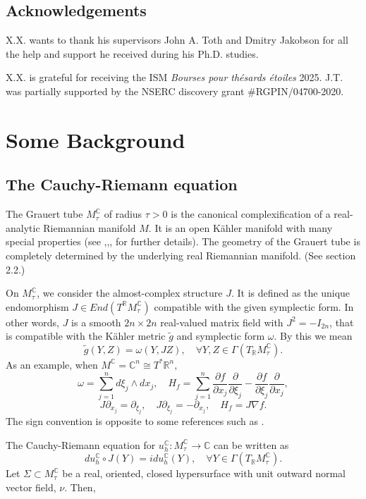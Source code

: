 \documentclass[11pt,reqno]{amsart}
\newcommand{\R}{{\mathbb R}}
\newcommand{\C}{{\mathbb C}}
\theoremstyle{definition}
\begin{document}
\subsection*{Acknowledgements}
X.X. wants to thank his supervisors John A. Toth and Dmitry Jakobson for all the help and support he received during his Ph.D. studies.

X.X. is grateful for receiving the ISM {\it Bourses pour thésards étoiles} 2025. J.T. was partially supported by the NSERC discovery grant \#RGPIN/04700-2020.




\section{Some Background} \label{tube}

\subsection{The Cauchy-Riemann equation}

The Grauert tube $M^{\mathbb{C}}_{\tau}$ of radius $\tau>0$ is the canonical complexification of a real-analytic Riemannian manifold $M$. It is an open K\"ahler manifold with many special properties (see \cite{LS91},\cite{S91},\cite{GS91},\cite{GS92} for further details). The geometry of the Grauert tube is completely determined by the underlying real Riemannian manifold. (See section 2.2.)

 On $M^{\mathbb{C}}_{\tau}$, we consider the almost-complex structure $J$. It is defined as the unique endomorphism $J\in End(T^{\R}M^{\mathbb{C}}_{\tau})$ compatible with the given symplectic form. In other words, $J$ is a smooth $2n\times 2n$ real-valued matrix field with $J^2=-I_{2n}$, that is compatible with the K\"ahler metric $\tilde{g}$ and symplectic form $\omega$. By this we mean
$$
\tilde{g}(Y,Z)=\omega(Y,JZ),\quad\forall Y,Z\in \Gamma (T_{\R}M^{\mathbb{C}}_{\tau}).
$$
As an  example, when $ M^{\C} = \mathbb{C}^n \cong T^* \R^n,$
$$
\omega=\sum_{j=1}^nd\xi_j\wedge dx_j,\quad H_f=\sum_{j=1}^n\frac{\partial f}{\partial x_j} \frac{\partial}{\partial \xi_j}-\frac{\partial f}{\partial \xi_j}\frac{\partial}{\partial x_j},
$$ 
$$
J\partial_{x_j}=\partial_{\xi_j}, \quad J\partial_{\xi_j}=-\partial_{x_j},\quad H_f=J\nabla f.
$$
The sign convention is opposite to some references such as \cite{Zw12}. 


The Cauchy-Riemann equation for $u^{\mathbb{C}}_h:M^{\mathbb{C}}_{\tau}\to\mathbb{C}$ can be written as
$$
du^{\mathbb{C}}_h\circ J(Y)=idu^{\mathbb{C}}_h(Y),\quad\forall Y\in \Gamma(T_{\R}M^{\mathbb{C}}_{\tau}).
$$
Let $\Sigma \subset M^{\C}_{\tau}$ be a real, oriented, closed  hypersurface with unit outward normal vector field, $\nu.$ Then,
\end{document}
